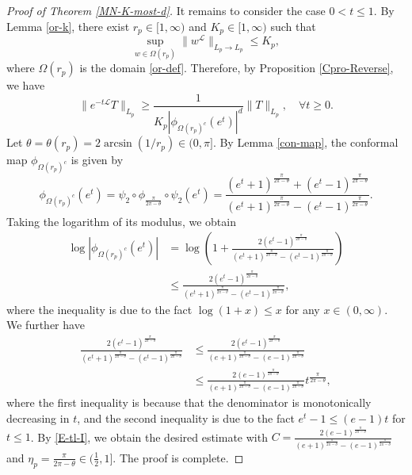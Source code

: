 \documentclass{amsbook}
\theoremstyle{definition}
\theoremstyle{remark}
\numberwithin{section}{chapter}
\numberwithin{equation}{chapter}
\newcommand{\1}{\mathbf{1}}
\begin{document}
\begin{proof}[Proof of Theorem \ref{MN-K-most-d}]
It remains to consider the case $0<t\leq1$.  By Lemma \ref{or-k}, there exist $r_p \in[1, \infty)$ and  $K_p \in[1, \infty)$ such that
$$\sup _{w\in \Omega(r_p)} \|w^{\mathcal{L}}\|_{L_{p} \rightarrow L_{p}} \leq K_p, $$
where $\Omega(r_p)$ is the domain \eqref{or-def}. Therefore, by Proposition \ref{Cpro-Reverse},  we have
\begin{equation}\label{E-tl-I}
\|e^{-t\mathcal{L}}T\|_{L_{p}} \geq \frac{1}{K_p|\phi_{\Omega(r_p)^{c}}(e^{t})|^{d}}\|T\|_{L_{p}},\quad \forall t \geq 0.
\end{equation}
Let $\theta=\theta(r_p)=2 \arcsin (1 / r_p) \in(0, \pi]$. By Lemma \ref{con-map}, the  conformal map $\phi_{\Omega(r_p)^{c}}$ is given by
$$
\phi_{\Omega(r_p)^{c}}(e^{t})=\psi_2\circ\phi_{\frac{\pi}{2\pi-\theta}}\circ\psi_2(e^{t})=\frac{\left(e^{t}+1\right)^{\frac{\pi}{2 \pi-\theta}}+\left(e^{t}-1\right)^{\frac{\pi}{2 \pi-\theta}}}{\left(e^{t}+1\right)^{\frac{\pi}{2 \pi-\theta}}-\left(e^{t}-1\right)^{\frac{\pi}{2 \pi-\theta}}} . 
$$
Taking the logarithm of its modulus, we obtain
\begin{align*}
\log \left|\phi_{\Omega(r_p)^{c}}\left(e^{t}\right)\right| & =\log \left(1+\frac{2\left(e^{t}-1\right)^{\frac{\pi}{2 \pi-\theta}}}{\left(e^{t}+1\right)^{\frac{\pi}{2 \pi-\theta}}-\left(e^{t}-1\right)^{\frac{\pi}{2 \pi-\theta}}}\right) \\
& \leq \frac{2\left(e^{t}-1\right)^{\frac{\pi}{2 \pi-\theta}}}{\left(e^{t}+1\right)^{\frac{\pi}{2 \pi-\theta}}-\left(e^{t}-1\right)^{\frac{\pi}{2 \pi-\theta}}},
\end{align*}
where the inequality is due to  the fact $\log(1+x)\leq x$ for any $x\in(0,\infty)$. 
We further have
\begin{align*}
\frac{2(e^{t}-1)^{\frac{\pi}{2 \pi-\theta}}}{(e^{t}+1)^{\frac{\pi}{2 \pi-\theta}}-(e^{t}-1)^{\frac{\pi}{2 \pi-\theta}}} & \leq \frac{2(e^{t}-1)^{\frac{\pi}{2 \pi-\theta}}}{(e+1)^{\frac{\pi}{2 \pi-\theta}}-(e-1)^{\frac{\pi}{2 \pi-\theta}}} \\
& \leq \frac{2(e-1)^{\frac{\pi}{2 \pi-\theta}}}{(e+1)^{\frac{\pi}{2 \pi-\theta}}-(e-1)^{\frac{\pi}{2 \pi-\theta}}} t^{\frac{\pi}{2 \pi-\theta}}, 
\end{align*}
where the first inequality is because that the denominator is monotonically decreasing in $t$, and the second inequality is due to the fact $e^t-1\leq (e-1)t$ for $t\leq 1$. By \eqref{E-tl-I}, we obtain the desired estimate with $C=\frac{2(e-1)^{\frac{\pi}{2 \pi-\theta}}}{(e+1)^{\frac{\pi}{2 \pi-\theta}}-(e-1)^{\frac{\pi}{2 \pi-\theta}}}$ and $\eta_p=\frac{\pi}{2\pi-\theta}\in(\frac{1}{2},1]$. The proof is complete.
\end{proof}
\end{document}
